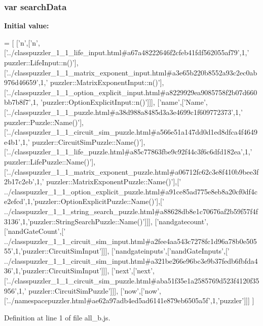 \subsubsection[{search\+Data}]{\setlength{\rightskip}{0pt plus 5cm}var search\+Data}\label{a00056_ad01a7523f103d6242ef9b0451861231e}
{\bfseries Initial value\+:}
\begin{DoxyCode}
=
[
  [\textcolor{charliteral}{'n'},[\textcolor{charliteral}{'n'},[\textcolor{stringliteral}{'../classpuzzler\_1\_1\_life\_input.html#a67a48222646f2cfeb41fdf562055af79'},1,\textcolor{stringliteral}{'
      puzzler::LifeInput::n()'}],[\textcolor{stringliteral}{'../classpuzzler\_1\_1\_matrix\_exponent\_input.html#a3e65b220b8552a93c2ec0ab976d46659'},1,\textcolor{stringliteral}{'
      puzzler::MatrixExponentInput::n()'}],[\textcolor{stringliteral}{'../classpuzzler\_1\_1\_option\_explicit\_input.html#a8229929ea9085758f2b07d660bb7b8f7'},1,\textcolor{stringliteral}{
      'puzzler::OptionExplicitInput::n()'}]]],
  [\textcolor{stringliteral}{'name'},[\textcolor{stringliteral}{'Name'},[\textcolor{stringliteral}{'../classpuzzler\_1\_1\_puzzle.html#a38d988a8485d3a3e4699c1f609772373'},1,\textcolor{stringliteral}{'
      puzzler::Puzzle::Name()'}],[\textcolor{stringliteral}{'../classpuzzler\_1\_1\_circuit\_sim\_puzzle.html#a566e51a147dd0d1ed8dfca4f4649e4b1'},1,\textcolor{stringliteral}{'
      puzzler::CircuitSimPuzzle::Name()'}],[\textcolor{stringliteral}{'../classpuzzler\_1\_1\_life\_puzzle.html#a85c77863fbe9c92f44c3f6c6dfd182ea'},1,\textcolor{stringliteral}{'
      puzzler::LifePuzzle::Name()'}],[\textcolor{stringliteral}{'../classpuzzler\_1\_1\_matrix\_exponent\_puzzle.html#a06712fc62c3e8f410b9bee3f2b17c2eb'},1,\textcolor{stringliteral}{'
      puzzler::MatrixExponentPuzzle::Name()'}],[\textcolor{stringliteral}{'
      ../classpuzzler\_1\_1\_option\_explicit\_puzzle.html#a91ce85ad775e8eb8a20cf0df4ce2efcd'},1,\textcolor{stringliteral}{'puzzler::OptionExplicitPuzzle::Name()'}],[\textcolor{stringliteral}{'
      ../classpuzzler\_1\_1\_string\_search\_puzzle.html#a88628db8e1c70676af2b59f57f4f3136'},1,\textcolor{stringliteral}{'puzzler::StringSearchPuzzle::Name()'}]]],
  [\textcolor{stringliteral}{'nandgatecount'},[\textcolor{stringliteral}{'nandGateCount'},[\textcolor{stringliteral}{'
      ../classpuzzler\_1\_1\_circuit\_sim\_input.html#a2fee4aa543c7278fc1d96a78b0e50555'},1,\textcolor{stringliteral}{'puzzler::CircuitSimInput'}]]],
  [\textcolor{stringliteral}{'nandgateinputs'},[\textcolor{stringliteral}{'nandGateInputs'},[\textcolor{stringliteral}{'
      ../classpuzzler\_1\_1\_circuit\_sim\_input.html#a321be266e96bc3e9b37fedb6fbfda436'},1,\textcolor{stringliteral}{'puzzler::CircuitSimInput'}]]],
  [\textcolor{stringliteral}{'next'},[\textcolor{stringliteral}{'next'},[\textcolor{stringliteral}{'../classpuzzler\_1\_1\_circuit\_sim\_puzzle.html#aba51f35e1a2585769d523f4120f35956'},1,\textcolor{stringliteral}{'
      puzzler::CircuitSimPuzzle'}]]],
  [\textcolor{stringliteral}{'now'},[\textcolor{stringliteral}{'now'},[\textcolor{stringliteral}{'../namespacepuzzler.html#ae62a97adb4ed5ad6141e879eb6505a5f'},1,\textcolor{stringliteral}{'puzzler'}]]]
]
\end{DoxyCode}


Definition at line 1 of file all\+\_\+b.\+js.

